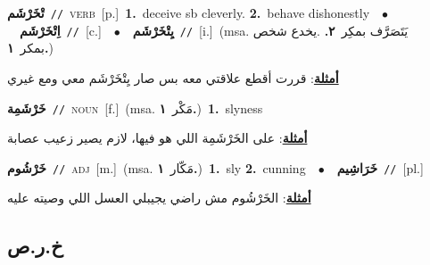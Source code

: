 \documentclass[10pt,a4paper,twoside]{article} %
\begin{document}
\begin{multicols}{2}
{\setlength\topsep{0pt}\textbf{\foreignlanguage{arabic}{تْخَرْشَم}}\ {\color{gray}\texttt{//}\color{black}}\ \textsc{verb}\ [p.]\ \textbf{1.}~deceive sb cleverly.  \textbf{2.}~behave dishonestly\ \ $\bullet$\ \ \setlength\topsep{0pt}\textbf{\foreignlanguage{arabic}{اِتْخَرْشَم}}\ {\color{gray}\texttt{//}\color{black}}\ [c.]\ \ $\bullet$\ \ \setlength\topsep{0pt}\textbf{\foreignlanguage{arabic}{يِتْخَرْشَم}}\ {\color{gray}\texttt{//}\color{black}}\ [i.]\ \color{gray}(msa. \foreignlanguage{arabic}{يَتَصَرَّف بمكِر}~\foreignlanguage{arabic}{\textbf{٢.}}  .\foreignlanguage{arabic}{يخدع شخص بمكر}~\foreignlanguage{arabic}{\textbf{١.}})\color{black}\  \begin{flushright}\color{gray}\foreignlanguage{arabic}{\textbf{\underline{\foreignlanguage{arabic}{أمثلة}}}: قررت أقطع علاقتي معه بس صار يِتْخَرْشَم معي ومع غيري}\end{flushright}\color{black}} \vspace{2mm}

{\setlength\topsep{0pt}\textbf{\foreignlanguage{arabic}{خَرْشَمِة}}\ {\color{gray}\texttt{//}\color{black}}\ \textsc{noun}\ [f.]\ \color{gray}(msa. \foreignlanguage{arabic}{مَكْر}~\foreignlanguage{arabic}{\textbf{١.}})\color{black}\ \textbf{1.}~slyness\  \begin{flushright}\color{gray}\foreignlanguage{arabic}{\textbf{\underline{\foreignlanguage{arabic}{أمثلة}}}: على الخَرْشَمِة اللي هو فيها، لازم يصير زعيب عصابة}\end{flushright}\color{black}} \vspace{2mm}

{\setlength\topsep{0pt}\textbf{\foreignlanguage{arabic}{خَرْشُوم}}\ {\color{gray}\texttt{//}\color{black}}\ \textsc{adj}\ [m.]\ \color{gray}(msa. \foreignlanguage{arabic}{مَكّار}~\foreignlanguage{arabic}{\textbf{١.}})\color{black}\ \textbf{1.}~sly  \textbf{2.}~cunning\ \ $\bullet$\ \ \setlength\topsep{0pt}\textbf{\foreignlanguage{arabic}{خَرَاشِيم}}\ {\color{gray}\texttt{//}\color{black}}\ [pl.]\  \begin{flushright}\color{gray}\foreignlanguage{arabic}{\textbf{\underline{\foreignlanguage{arabic}{أمثلة}}}: الخَرْشُوم مش راضي يجيبلي العسل اللي وصيته عليه}\end{flushright}\color{black}} \vspace{2mm}

\vspace{-3mm}
\subsection*{\color{blue}\foreignlanguage{arabic}{خ.ر.ص}\color{blue}{}} 


\end{multicols}
\end{document}
